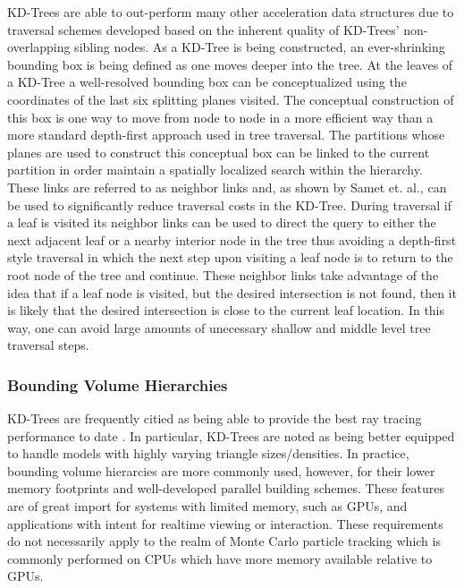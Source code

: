 \documentclass[12pt, a4paper]{article}
\begin{document}
KD-Trees are able to out-perform many other acceleration data structures due to traversal schemes developed based on the inherent quality of KD-Trees' non-overlapping sibling nodes. As a KD-Tree is being constructed, an ever-shrinking bounding box is being defined as one moves deeper into the tree. At the leaves of a KD-Tree a well-resolved bounding box can be conceptualized using the coordinates of the last six splitting planes visited. The conceptual construction of this box is one way to move from node to node in a more efficient way than a more standard depth-first approach used in tree traversal. The partitions whose planes are used to construct this conceptual box can be linked to the current partition in order maintain a spatially localized search within the hierarchy. These links are referred to as neighbor links and, as shown by Samet et. al.\cite{Samet_1989}, can be used to significantly reduce traversal costs in the KD-Tree. During traversal if a leaf is visited its neighbor links can be used to direct the query to either the next adjacent leaf or a nearby interior node in the tree thus avoiding a depth-first style traversal in which the next step upon visiting a leaf node is to return to the root node of the tree and continue. These neighbor links take advantage of the idea that if a leaf node is visited, but the desired intersection is not found, then it is likely that the desired intersection is close to the current leaf location. In this way, one can avoid large amounts of unecessary shallow and middle level tree traversal steps.

\subsubsection{Bounding Volume Hierarchies}%

KD-Trees are frequently citied as being able to provide the best ray tracing performance to date \cite{Ernst_2007,Hurley_2002,Havran_2000}. In particular, KD-Trees are noted as being better equipped to handle models with highly varying triangle sizes/densities. In practice, bounding volume hierarcies are more commonly used, however, for their lower memory footprints and well-developed parallel building schemes. These features are of great import for systems with limited memory, such as GPUs, and applications with intent for realtime viewing or interaction. These requirements do not necessarily apply to the realm of Monte Carlo particle tracking which is commonly performed on CPUs which have more memory available relative to GPUs.
\end{document}
